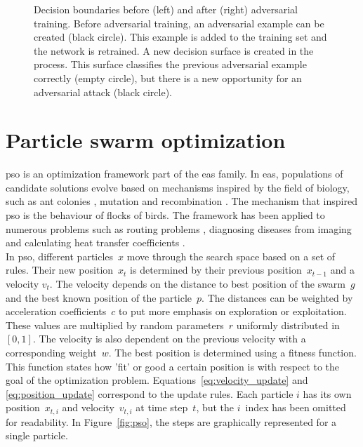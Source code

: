 \begin{figure}
\begin{tikzpicture}[x=0.75pt,y=0.75pt,yscale=-1,xscale=1]
\end{tikzpicture}
\caption[Adversarial training]{Decision boundaries before (left) and after (right) adversarial training. Before adversarial training, an adversarial example can be created (black circle). This example is added to the training set and the network is retrained. A new decision surface is created in the process. This surface classifies the previous adversarial example correctly (empty circle), but there is a new opportunity for an adversarial attack (black circle).}
\label{fig:adversarial_training}
\end{figure}


\section{Particle swarm optimization}
\gls{pso} \cite{pso} is an optimization framework part of the \glspl{ea} family. In \glspl{ea}, populations of candidate solutions evolve based on mechanisms inspired by the field of biology, such as ant colonies \cite{aco}, mutation and recombination \cite{genetic_algorithm}. The mechanism that inspired \gls{pso} is the behaviour of flocks of birds. The framework has been applied to numerous problems such as routing problems \cite{ev_transport, freight_transport}, diagnosing diseases from imaging \cite{leukemia_pso} and calculating heat transfer coefficients \cite{heat_transfer_pso}.\\

In \gls{pso}, different particles~$x$ move through the search space based on a set of rules. Their new position~$x_t$ is determined by their previous position~$x_{t-1}$ and a velocity $v_t$. The velocity depends on the distance to best position of the swarm~$g$ and the best known position of the particle~$p$. The distances can be weighted by acceleration coefficients~$c$ to put more emphasis on exploration or exploitation. These values are multiplied by random parameters~$r$ uniformly distributed in~$[0,1]$. The velocity is also dependent on the previous velocity with a corresponding weight~$w$. The best position is determined using a fitness function. This function states how 'fit' or good a certain position is with respect to the goal of the optimization problem. Equations~\ref{eq:velocity_update} and \ref{eq:position_update} correspond to the update rules. Each particle $i$ has its own position~$x_{t,i}$ and velocity~$v_{t,i}$ at time step~$t$, but the $i$~index has been omitted for readability. In Figure~\ref{fig:pso}, the steps are graphically represented for a single particle.

